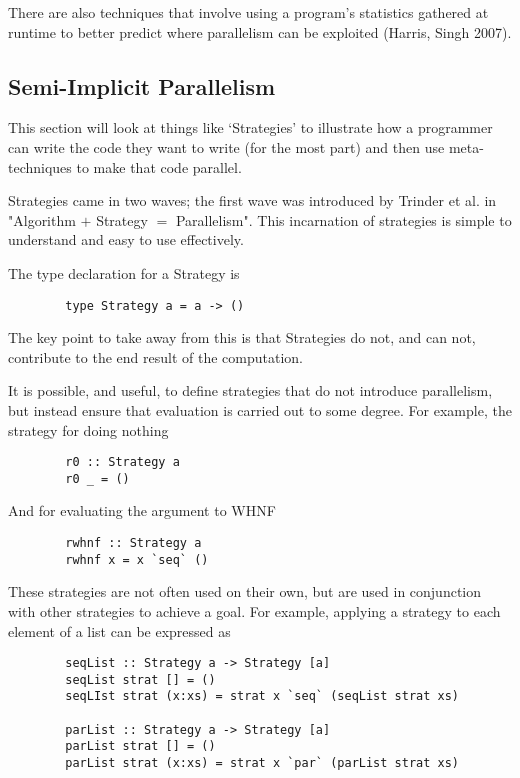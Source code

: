     There are also techniques that involve using a program's statistics gathered
at runtime to better predict where parallelism can be exploited (Harris, Singh
2007).

 \subsection{Semi-Implicit Parallelism}
    This section will look at things like `Strategies' to illustrate how a
programmer can write the code they want to write (for the most part) and then
use meta-techniques to make that code parallel.

Strategies came in two waves; the first wave was introduced by Trinder et al. in
"Algorithm \(+\) Strategy \(=\) Parallelism". This incarnation of strategies is
simple to understand and easy to use effectively.

The type declaration for a Strategy is

\begin{verbatim}
        type Strategy a = a -> ()
\end{verbatim}

The key point to take away from this is that Strategies do not, and can not,
contribute to the end result of the computation.

It is possible, and useful, to define strategies that do not introduce
parallelism, but instead ensure that evaluation is carried out to some degree.
For example, the strategy for doing nothing

\begin{verbatim}
        r0 :: Strategy a
        r0 _ = ()
\end{verbatim}

And for evaluating the argument to WHNF

\begin{verbatim}
        rwhnf :: Strategy a
        rwhnf x = x `seq` ()
\end{verbatim}

These strategies are not often used on their own, but are used in conjunction
with other strategies to achieve a goal. For example, applying a strategy to
each element of a list can be expressed as

\begin{verbatim}
        seqList :: Strategy a -> Strategy [a]
        seqList strat [] = ()
        seqLIst strat (x:xs) = strat x `seq` (seqList strat xs)

        parList :: Strategy a -> Strategy [a]
        parList strat [] = ()
        parList strat (x:xs) = strat x `par` (parList strat xs)
\end{verbatim}

